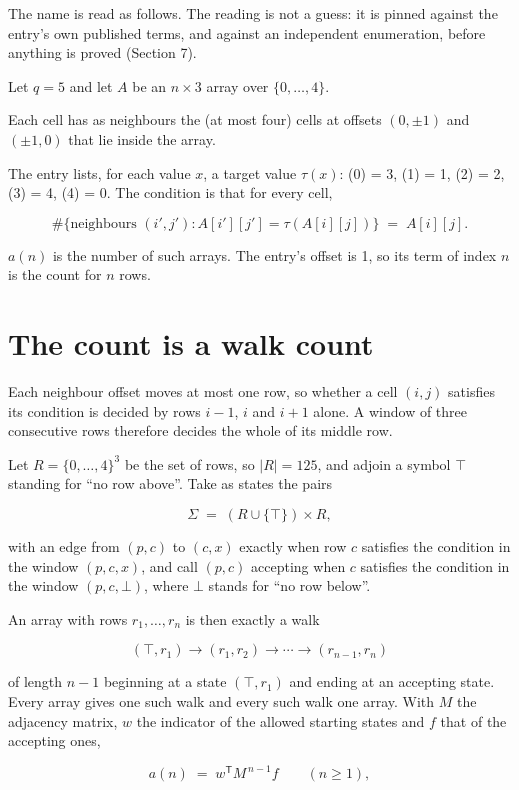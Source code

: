 \documentclass[11pt]{article}
\theoremstyle{definition}
\begin{document}
The name is read as follows. The reading is not a guess: it is pinned against the entry's own published terms, and against an independent enumeration, before anything is proved (Section 7).

Let $q = 5$ and let $A$ be an $n \times 3$ array over $\{0,\dots,4\}$.

Each cell has as neighbours the (at most four) cells at offsets $(0,\pm1)$ and $(\pm1,0)$ that lie inside the array.

The entry lists, for each value $x$, a target value $\tau(x)$: \tau(0) = 3, \tau(1) = 1, \tau(2) = 2, \tau(3) = 4, \tau(4) = 0. The condition is that for every cell,

\[\#\{\text{neighbours } (i',j') : A[i'][j'] = \tau(A[i][j])\} \;=\; A[i][j].\]

$a(n)$ is the number of such arrays. The entry's offset is 1, so its term of index $n$ is the count for $n$ rows.

\section{The count is a walk count}

Each neighbour offset moves at most one row, so whether a cell $(i,j)$ satisfies its condition is decided by rows $i-1$, $i$ and $i+1$ alone. A window of three consecutive rows therefore decides the whole of its middle row.

Let $R = \{0,\dots,4\}^{3}$ be the set of rows, so $|R| = 125$, and adjoin a symbol $\top$ standing for ``no row above''. Take as states the pairs

\[\Sigma \;=\; (R \cup \{\top\}) \times R,\]

with an edge from $(p,c)$ to $(c,x)$ exactly when row $c$ satisfies the condition in the window $(p,c,x)$, and call $(p,c)$ accepting when $c$ satisfies the condition in the window $(p,c,\bot)$, where $\bot$ stands for ``no row below''.

An array with rows $r_1,\dots,r_n$ is then exactly a walk

\[(\top,r_1) \to (r_1,r_2) \to \cdots \to (r_{n-1},r_n)\]

of length $n-1$ beginning at a state $(\top,r_1)$ and ending at an accepting state. Every array gives one such walk and every such walk one array. With $M$ the adjacency matrix, $w$ the indicator of the allowed starting states and $f$ that of the accepting ones,

\[a(n) \;=\; w^{\mathsf T} M^{\,n-1} f \qquad (n \ge 1),\]
\end{document}

